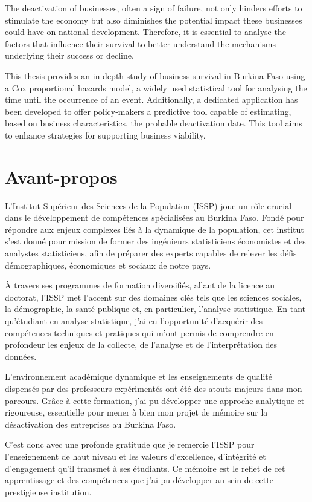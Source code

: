 \documentclass[a4paper,12pt]{report}
\begin{document}
The deactivation of businesses, often a sign of failure, not only hinders efforts to stimulate the economy but also diminishes the potential impact these businesses could have on national development. Therefore, it is essential to analyse the factors that influence their survival to better understand the mechanisms underlying their success or decline.

This thesis provides an in-depth study of business survival in Burkina Faso using a Cox proportional hazards model, a widely used statistical tool for analysing the time until the occurrence of an event. Additionally, a dedicated application has been developed to offer policy-makers a predictive tool capable of estimating, based on business characteristics, the probable deactivation date. This tool aims to enhance strategies for supporting business viability.




\chapter*{Avant-propos}
L'Institut Supérieur des Sciences de la Population (ISSP) joue un rôle crucial dans le développement de compétences spécialisées au Burkina Faso. Fondé pour répondre aux enjeux complexes liés à la dynamique de la population, cet institut s'est donné pour mission de former des ingénieurs statisticiens économistes et des analystes statisticiens, afin de préparer des experts capables de relever les défis démographiques, économiques et sociaux de notre pays.

À travers ses programmes de formation diversifiés, allant de la licence au doctorat, l'ISSP met l'accent sur des domaines clés tels que les sciences sociales, la démographie, la santé publique et, en particulier, l'analyse statistique. En tant qu'étudiant en analyse statistique, j'ai eu l'opportunité d'acquérir des compétences techniques et pratiques qui m'ont permis de comprendre en profondeur les enjeux de la collecte, de l'analyse et de l'interprétation des données.

L'environnement académique dynamique et les enseignements de qualité dispensés par des professeurs expérimentés ont été des atouts majeurs dans mon parcours. Grâce à cette formation, j'ai pu développer une approche analytique et rigoureuse, essentielle pour mener à bien mon projet de mémoire sur la désactivation des entreprises au Burkina Faso.

C'est donc avec une profonde gratitude que je remercie l'ISSP pour l'enseignement de haut niveau et les valeurs d'excellence, d'intégrité et d'engagement qu'il transmet à ses étudiants. Ce mémoire est le reflet de cet apprentissage et des compétences que j'ai pu développer au sein de cette prestigieuse institution.
\end{document}
